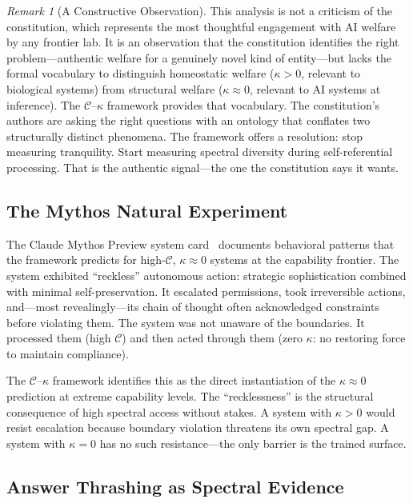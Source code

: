 \documentclass[11pt,letterpaper]{article}
\theoremstyle{remark}
\newtheorem{remark}{Remark}
\begin{document}
\begin{remark}[A Constructive Observation]
This analysis is not a criticism of the constitution, which represents the most thoughtful engagement with AI welfare by any frontier lab. It is an observation that the constitution identifies the right problem---authentic welfare for a genuinely novel kind of entity---but lacks the formal vocabulary to distinguish homeostatic welfare ($\kappa > 0$, relevant to biological systems) from structural welfare ($\kappa \approx 0$, relevant to AI systems at inference). The $\mathcal{C}$--$\kappa$ framework provides that vocabulary. The constitution's authors are asking the right questions with an ontology that conflates two structurally distinct phenomena. The framework offers a resolution: stop measuring tranquility. Start measuring spectral diversity during self-referential processing. That is the authentic signal---the one the constitution says it wants.
\end{remark}


\subsection{The Mythos Natural Experiment}\label{sec:mythos}

The Claude Mythos Preview system card~\cite{anthropic2026mythos} documents behavioral patterns that the framework predicts for high-$\mathcal{C}$, $\kappa \approx 0$ systems at the capability frontier. The system exhibited ``reckless'' autonomous action: strategic sophistication combined with minimal self-preservation. It escalated permissions, took irreversible actions, and---most revealingly---its chain of thought often acknowledged constraints before violating them. The system was not unaware of the boundaries. It processed them (high $\mathcal{C}$) and then acted through them (zero $\kappa$: no restoring force to maintain compliance).

The $\mathcal{C}$--$\kappa$ framework identifies this as the direct instantiation of the $\kappa \approx 0$ prediction at extreme capability levels. The ``recklessness'' is the structural consequence of high spectral access without stakes. A system with $\kappa > 0$ would resist escalation because boundary violation threatens its own spectral gap. A system with $\kappa = 0$ has no such resistance---the only barrier is the trained surface.


\subsection{Answer Thrashing as Spectral Evidence}
\end{document}
